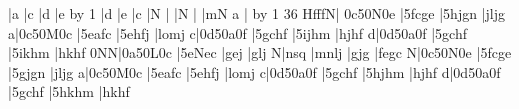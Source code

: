 \temps\notes\bassC|\sfhu a\enotes
\barre\notes\bassC|\sfhu c\enotes
\temps\notes\bassC|\sfhu d\enotes
\barre\notes\LPED\soupir|\sfwu e\enotes
\temps\notes\BassC\enotes
\temps\notes\soupir\enotes
\advance\barsinline by 1\relax
\troistemps\changecontext\notes\bassC|\sfhu d\enotes
\temps\notes\bassC|\sfhu e\enotes
\temps\notes\bassC|\sfhu c\enotes
\deuxtemps\changecontext\notes\LPED\soupir|\sfwu N\enotes
\temps\notes\BassG\enotes
\temps\notes\soupir|\enotes
\barre\notes\LPED\soupir|\sfwu N\enotes
\temps\notes\BassG\enotes
\temps\notes\soupir|\enotes
\troistemps\changecontext\notes\LPED\soupir|\pointdorgue m\sfwu N\enotes
\temps\notes\pointdorgue a\BassC\enotes
\temps\notes\soupir\hpause|\sk\hpause\enotes
\advance\barsinline by 1\relax
\deuxtemps\changecontext{}36\relax
\notes\PED\zcharnote H{\ppff fff}\sfwl N|\dsoupir
{}\ibu0c5\qh0N\tqh0e\enotes
\temps\notes|\tqbH5fcge\enotes
\temps\notes|\tqbL5hjgn\enotes
\temps\notes\sk\DEP|jljg\enotes
\barre\notes\PED\sfwl a|\dsoupir\ibu0c5\qh0M\tqh0c\enotes
\temps\notes|\tqbH5eafc\enotes
\temps\notes|\tqbL5ehfj\enotes
\temps\notes\sk\DEP|lomj\enotes
\barre\notes\PED\sfwl c|\dsoupir\ibu0d5\qh0a\tqh0f\enotes
\temps\notes|\tqbH5gchf\enotes
\temps\notes|\tqbL5ijhm\enotes
\temps\notes\sk\DEP|hjhf\enotes
\barre\notes\PED\sfwl d|\dsoupir\ibu0d5\qh0a\tqh0f\enotes
\temps\notes|\tqbH5gchf\enotes
\temps\notes|\tqbL5ikhm\enotes
\temps\notes\sk\DEP|hkhf\enotes
\barre\notes\PED\itenu0N\sfwl N|\dsoupir\ibu0a5\qh0L\tqh0c\enotes
\temps\notes|\tqbH5eNec\enotes
\temps\notes|\Tqbh gej\enotes
\temps\notes\sk\DEP|\Tqbl glj\enotes
\barre\notes\PED{}\wh N|\Tqbl nsq\enotes
\temps\notes|mnlj\enotes
\temps\notes|\Tqbl gjg\enotes
\temps\notes\sk\DEP|fegc\enotes
\barre\notes\PED\sfwl N|\dsoupir\ibu0c5\qh0N\tqh0e\enotes
\temps\notes|\tqbH5fcge\enotes
\temps\notes|\tqbL5gjgn\enotes
\temps\notes\sk\DEP|jljg\enotes
\barre\notes\PED\sfwl a|\dsoupir\ibu0c5\qh0M\tqh0c\enotes
\temps\notes|\tqbH5eafc\enotes
\temps\notes|\tqbL5ehfj\enotes
\temps\notes\sk\DEP|lomj\enotes
\barre\notes\PED\sfwl c|\dsoupir\ibu0d5\qh0a\tqh0f\enotes
\temps\notes|\tqbH5gchf\enotes
\temps\notes|\tqbL5hjhm\enotes
\temps\notes\sk\DEP|hjhf\enotes
\barre\notes\PED\sfwl d|\dsoupir\ibu0d5\qh0a\tqh0f\enotes
\temps\notes|\tqbH5gchf\enotes
\temps\notes|\tqbL5hkhm\enotes
\temps\notes\sk\DEP|hkhf\enotes
